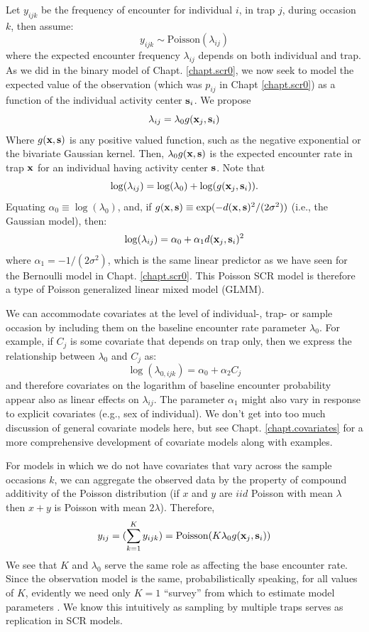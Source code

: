 Let $y_{ijk}$ be the frequency of encounter for
individual $i$, in trap $j$, during occasion $k$, then assume:
\[
 y_{ijk} \sim \mbox{Poisson}(\lambda_{ij})
\]
where the expected encounter frequency $\lambda_{ij}$ depends on both
individual and trap. As we did in the binary model of
Chapt. \ref{chapt.scr0}, we
now seek to model the expected value of the observation (which was
$p_{ij}$ in Chapt \ref{chapt.scr0}) as a function of the individual activity center
${\bf s}_{i}$.
We propose
\[
 \lambda_{ij} = \lambda_{0}  g({\bf x}_{j},{\bf s}_{i})
\]
Where $g({\bf x},{\bf s})$ is any positive valued function, such as
the negative exponential or the bivariate Gaussian kernel.
Then, $\lambda_{0}g({\bf x},{\bf s})$ is the expected encounter rate in trap
${\bf x}$ for an individual having activity center ${\bf s}$.  Note
that
\[
 \log(\lambda_{ij}) = \log(\lambda_{0}) + \log(  g({\bf x}_{j},{\bf
   s}_{i}) ).
\]
Equating $\alpha_{0} \equiv \log(\lambda_{0})$, and, if
$g({\bf x},{\bf s}) \equiv \exp(-  d({\bf x},{\bf s})^2 /(2\sigma^2))$
(i.e., the Gaussian model), then:
\begin{equation}
 \log(\lambda_{ij}) = \alpha_{0} + \alpha_{1} d({\bf x}_{j},{\bf s}_{i})^{2}
\label{poisson-mn.eq.lp}
\end{equation}
where $\alpha_{1} = -1/(2\sigma^2)$, 
which is the same linear predictor as we have seen for the Bernoulli
model in Chapt. \ref{chapt.scr0}.  This Poisson SCR model is therefore
a type of Poisson generalized linear mixed model (GLMM).

We can accommodate covariates at the level of individual-, trap- or
sample occasion by including them on the baseline encounter rate
parameter $\lambda_{0}$. For example, if $C_{j}$ is some covariate
that depends on trap only, then we express the relationship between
$\lambda_{0}$ and $C_{j}$ as:
\[
\log(\lambda_{0,ijk}) = \alpha_{0} + \alpha_{2} C_{j}
\]
and therefore covariates on the logarithm of baseline encounter
probability appear also as linear effects on $\lambda_{ij}$. The
parameter $\alpha_{1}$ might also vary in response to explicit
covariates (e.g., sex of individual). We don't get into too much
discussion of general covariate models here, but see
Chapt. \ref{chapt.covariates} for a more comprehensive development of
covariate models along with examples.


For models in which we do not have covariates that vary across the
sample occasions $k$, we can aggregate the observed data by the
property of compound additivity of the Poisson distribution (if $x$
and $y$ are $iid$ Poisson with mean $\lambda$ then $x+y$ is Poisson
with mean $2\lambda$). Therefore,
\[
y_{ij} = (\sum_{k=1}^{K} y_{ijk}) =  \mbox{Poisson}(K  \lambda_{0}
g({\bf x}_{j},{\bf s}_{i}) )
\]
We see that $K$ and $\lambda_{0}$ serve the same role as affecting the
base encounter rate. Since the observation model is the same,
probabilistically speaking, for all values of $K$, evidently we need
only $K=1$ ``survey'' from which to estimate model parameters
\citep{efford_etal:2009ecol}. We know this intuitively as sampling by
multiple traps serves as replication in SCR models.

